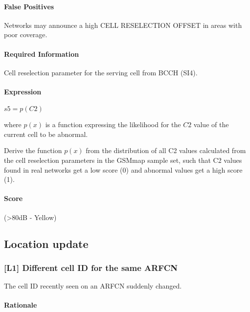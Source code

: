 \documentclass[a4paper,11pt,notitlepage,bigheadings,oneside]{scrartcl}
\begin{document}
\paragraph{False Positives}

Networks may announce a high CELL RESELECTION OFFSET in areas with poor
coverage.


\paragraph{Required Information}

Cell reselection parameter for the serving cell from BCCH (SI4).

\paragraph{Expression}

$s5 = p(C2)$

where $p(x)$ is a function expressing the likelihood for the $C2$ value of the
current cell to be abnormal.

\TBD{} Derive the function $p(x)$ from the distribution of all C2 values
calculated from the cell reselection parameters in the GSMmap sample set, such
that C2 values found in real networks get a low score (0) and abnormal values
get a high score (1).

\paragraph{Score}

\TBD{} (\textgreater 80dB - Yellow)

\subsection{Location update}

\subsubsection{[L1] Different cell ID for the same ARFCN}

The cell ID recently seen on an ARFCN suddenly changed.

\paragraph{Rationale}
\end{document}
